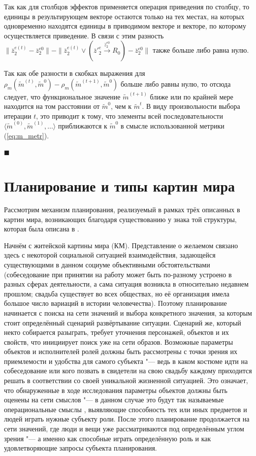 \documentclass[a4paper, 12pt]{article}
\theoremstyle{plain}
\newenvironment{Proof}%
	{\par\noindent{\bf Доказательство.}}%
	{\hfill$\scriptstyle\blacksquare$}
\begin{document}
\begin{Proof}
		Так как для столбцов эффектов применяется операция приведения по столбцу, то единицы в результирующем векторе остаются только на тех местах, на которых одновременно находятся единицы в приводимом векторе и векторе, по которому осуществляется приведение. В связи с этим разность $\|\bar z_2^{e(t)}-\bar z_2^{e0}\|-\|\bar z_2^{e(t)}\vee (\bar z'^e_2\xrightarrow{\bar z_2^{e0}} R_0)-\bar z_2^{e0}\|$ также больше либо равна нулю.
		
		Так как обе разности в скобках выражения для $\rho_m(\tilde m^{(t)},\tilde m^0)-\rho_m(\tilde m^{(t+1)},\tilde m^0)$ больше либо равны нулю, то отсюда следует, что функциональное значение $\tilde m^{(t+1)}$ ближе или по крайней мере находится на том расстоянии от $\tilde m^0$, чем к $\tilde m^{t}$. В виду произвольности выбора итерации $t$, это приводит к тому, что элементы всей последовательности $\langle\tilde m^{(0)},\tilde m^{(1)},\dots\rangle$ приближаются к $\tilde m^0$ в смысле использованной метрики (\ref{eq:m_metr}). 

	\end{Proof}
	
	\section{Планирование и типы картин мира} \label{sect:plan_wm}
	Рассмотрим механизм планирования, реализуемый в рамках трёх описанных в \cite{Chudova2012a} картин мира, возникающих благодаря существованию у знака той структуры, которая была описана в \cite{PanovA2014a}.
	
	Начнём с житейской картины мира (КМ). Представление о желаемом связано здесь с некоторой социальной ситуацией взаимодействия, задающейся существующими в данном социуме объективными обстоятельствами (собеседование при принятии на работу может быть по-разному устроено в разных сферах деятельности, а сама ситуация возникла в относительно недавнем прошлом; свадьба существует во всех обществах, но её организация имела большое число вариаций в истории человечества). Поэтому планирование начинается с поиска на сети значений и выбора конкретного значения, за которым стоит определённый сценарий развёртывание ситуации. Сценарий же, который некто собирается разыграть, требует уточнения персонажей, объектов и их свойств, что инициирует поиск уже на сети образов. Возможные параметры объектов и исполнителей ролей должны быть рассмотрены с точки зрения их приемлемости и удобства для самого субъекта "--- ведь в каком костюме идти на собеседование или кого позвать в свидетели на свою свадьбу каждому приходится решать в соответствии со своей уникальной жизненной ситуацией. Это означает, что обнаруженные в ходе исследования параметры объектов должны быть оценены на сети смыслов "--- в данном случае это будут так называемые операциональные смыслы \cite{Tikhomirov2002}, выявляющие способность тех или иных предметов и людей играть нужные субъекту роли. После этого планирование продолжается на сети значений, где люди и вещи уже рассматриваются под определённым углом зрения "--- а именно как способные играть определённую роль и как удовлетворяющие запросы субъекта планирования.
	
\end{document}
